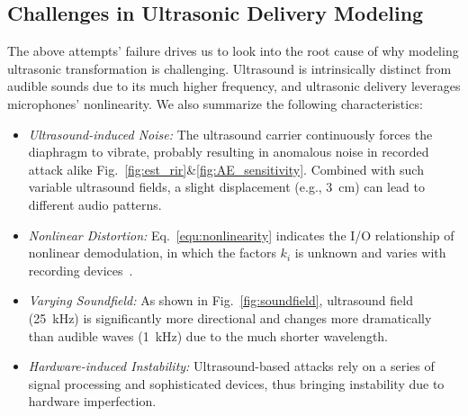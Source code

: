 \subsection{Challenges in Ultrasonic Delivery Modeling}\label{sec:ultrasound_observation}
The above attempts' failure drives us to look into the root cause of why modeling ultrasonic transformation is challenging. Ultrasound is intrinsically distinct from audible sounds due to its much higher frequency, and ultrasonic delivery leverages microphones' nonlinearity.
We also summarize the following characteristics:\\ %
\begin{itemize}[leftmargin=*,topsep=-20pt]
    \item \emph{Ultrasound-induced Noise:} %
    The ultrasound carrier continuously forces the diaphragm to vibrate, probably resulting in anomalous noise in recorded attack alike Fig.~\ref{fig:est_rir}\&\ref{fig:AE_sensitivity}. Combined with such variable ultrasound fields, a slight displacement (e.g., 3~cm) can lead to different audio patterns.
    \item \emph{Nonlinear Distortion:} Eq.~\ref{equ:nonlinearity} indicates the I/O relationship of nonlinear demodulation, in which the factors $k_i$ is unknown and varies with recording devices~\cite{li2023learning}. 
    \item \emph{Varying Soundfield:} As shown in Fig.~\ref{fig:soundfield}, ultrasound field (25~kHz) is significantly more directional and changes more dramatically than audible waves (1~kHz) due to the much shorter wavelength.
    \item \emph{Hardware-induced Instability:} Ultrasound-based attacks rely on a series of signal processing and sophisticated devices, thus bringing instability due to hardware imperfection. 
\end{itemize}



\iffalse
